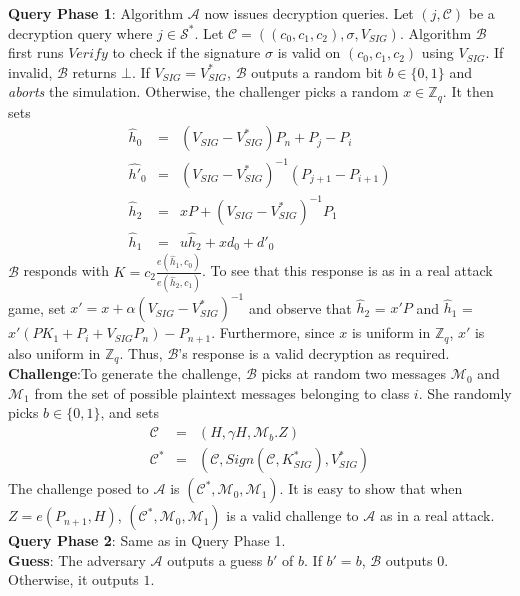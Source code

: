 \noindent\textbf{Query Phase 1}: Algorithm $\mathcal{A}$ now issues decryption queries. Let $(j,\mathcal{C})$ be a decryption query where $j\in{\mathcal{S}}^{*}$. Let $\mathcal{C}=((c_0,c_1,c_2),\sigma,V_{SIG})$. Algorithm $\mathcal{B}$ first runs $Verify$ to check if the signature $\sigma$ is valid on $(c_0,c_1,c_2)$ using $V_{SIG}$. If invalid, $\mathcal{B}$ returns $\bot$. If $V_{SIG} = {V^{*}_{SIG}}$, $\mathcal{B}$ outputs a random bit $b\in\{0,1\}$ and \emph{aborts} the simulation. Otherwise, the challenger picks a random $x\in\mathbb{Z}_q$. It then sets
\begin{eqnarray}
 \hat{h}_0&=&(V_{SIG}-{V^{*}_{SIG}})P_n+P_j-P_i\nonumber\\
 \hat{h'}_0&=&{(V_{SIG}-{V^{*}_{SIG}})}^{-1}(P_{j+1}-P_{i+1})\nonumber \\
 \hat{h}_2&=&xP+{(V_{SIG}-{V^{*}_{SIG}})}^{-1}P_1\nonumber\\
 \hat{h}_1&=&u\hat{h}_2 + xd_0 + d'_0 \nonumber 
\end{eqnarray}
\noindent $\mathcal{B}$ responds with $K=c_2\frac{{e}(\hat{h}_1,c_0)}{{e}(\hat{h}_2,c_1)}$. To see that this response is as in a real attack game, set $x'=x+\alpha{(V_{SIG}-{V^{*}_{SIG}})}^{-1}$ and observe that $\hat{h}_2$ = $x'P$ and $\hat{h}_1$ = $x'(PK_1+P_i+V_{SIG}P_n)-P_{n+1}$. Furthermore, since $x$ is uniform in $\mathbb{Z}_q$, $x'$ is also uniform in $\mathbb{Z}_q$. Thus, $\mathcal{B}$'s response is a valid decryption as required.\\
 
\noindent\textbf{Challenge}:To generate the challenge, $\mathcal{B}$ picks at random two messages $\mathcal{M}_0$ and $\mathcal{M}_1$ from the set of possible plaintext messages belonging to class $i$. She randomly picks $b\in\{0,1\}$, and sets 
\begin{eqnarray}
 \mathcal{C}&=&(H,\gamma H,\mathcal{M}_b.Z)\nonumber\\
 \mathcal{C}^{*}&=&(\mathcal{C},Sign(\mathcal{C},{K^{*}_{SIG}}),{V^{*}_{SIG}})\nonumber
\end{eqnarray}
\noindent The challenge posed to $\mathcal{A}$ is $(\mathcal{C}^{*},\mathcal{M}_0,\mathcal{M}_1)$. It is easy to show that when $Z={e}(P_{n+1},H)$, $({\mathcal{C}}^{*},\mathcal{M}_0,\mathcal{M}_1)$ is a valid challenge to $\mathcal{A}$ as in a real attack.\\
 
\noindent\textbf{Query Phase 2}: Same as in Query Phase 1.\\ 
 
\noindent\textbf{Guess}: The adversary $\mathcal{A}$ outputs a guess $b'$ of $b$. If $b' = b$, $\mathcal{B}$ outputs $0$. Otherwise, it outputs $1$.\\

